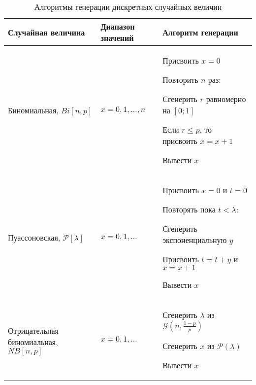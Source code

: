 \begin{table}[h]
\caption{\label{tab:algod} Алгоритмы генерации дискретных случайных величин}
\begin{tabular}{p{5cm}p{4cm}p{7cm}}
\hline
\hline 
Случайная величина & Диапазон значений & Алгоритм генерации \\
\hline
Биномиальная, $Bi[n,p]$ & $x=0,1,\ldots,n$ & Присвоить $x = 0$

Повторить $n$ раз:

\hspace{0.5cm}Сгенерить $r$ равномерно на $[0;1]$ 

\hspace{0.5cm}Если $r\leq p$, то присвоить $x = x+1$

Вывести $x$ \\

Пуассоновская, $\mathcal{P}[\lambda]$ & $x=0,1,\ldots$ & Присвоить $x = 0$ и $t = 0$

Повторять пока $t<\lambda$:

\hspace{0.5cm}Сгенерить экспоненциальную $y$  

\hspace{0.5cm}Присвоить $t=t+y$ и $x=x+1$

Вывести $x$ \\
Отрицательная биномиальная, $NB[n,p]$ & $x=0,1,\ldots$ & Сгенерить $\lambda$ из $\mathcal{G}(n,\frac{1-p}{p})$

Сгенерить $x$ из $\mathcal{P}(\lambda)$ 

Вывести $x$ \\
\hline
\hline
\end{tabular}
\end{table}


